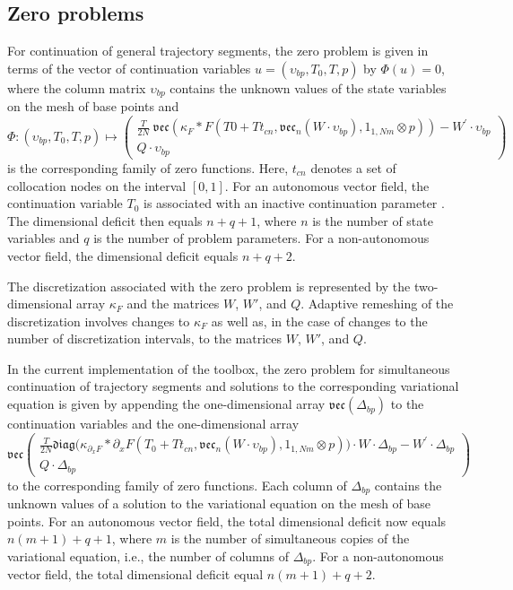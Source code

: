 \subsection{Zero problems}
For continuation of general trajectory segments, the zero problem is given in terms of the vector of continuation variables $u=(\upsilon_{bp},T_0,T,p)$ by $\Phi(u)=0$, where the column matrix $\upsilon_{bp}$ contains the unknown values of the state variables on the mesh of base points and
\begin{equation}
\Phi:\left(\upsilon_{bp}, T_0,T, p\right)\mapsto\left(\begin{array}{c}
\frac{T}{2N}\ \mathfrak{vec}\left(\kappa_F\ast F\left(T0+Tt_{cn}, \mathfrak{vec}_{n}\left( W\cdot
\upsilon_{bp}\right) ,1_{1,Nm}\otimes p\right) \right) -W^{\prime }\cdot \upsilon_{bp}\\
Q\cdot \upsilon_{bp}
\end{array}\right)
\end{equation}
is the corresponding family of zero functions. Here, $t_{cn}$ denotes a set of collocation nodes on the interval $[0,1]$. For an autonomous vector field, the continuation variable $T_0$ is associated with an inactive continuation parameter . The dimensional deficit then equals $n+q+1$, where $n$ is the number of state variables and $q$ is the number of problem parameters. For a non-autonomous vector field, the dimensional deficit equals $n+q+2$.

The discretization associated with the zero problem is represented by the two-dimensional array $\kappa_F$ and the matrices $W$, $W'$, and $Q$. Adaptive remeshing of the discretization involves changes to $\kappa_F$ as well as, in the case of changes to the number of discretization intervals, to the matrices $W$, $W'$, and $Q$.

In the current implementation of the  toolbox, the zero problem for simultaneous continuation of trajectory segments and solutions to the corresponding variational equation is given by appending the one-dimensional array $\mathfrak{vec}\left(\Delta_{bp}\right)$ to the continuation variables and the one-dimensional array
\begin{equation}
\mathfrak{vec}\left(\begin{array}{c}\frac{T}{2N}  \mathfrak{diag}\big(\kappa_{\partial_x F} * \partial_{x}F\left( T_0+Tt_{cn},\mathfrak{vec}_{n}\left( W\cdot \upsilon_{bp}\right),1_{1,Nm}\otimes p\right) \big) \cdot W\cdot\Delta_{bp}-W^{\prime }\cdot\Delta_{bp}\\Q\cdot\Delta_{bp}\end{array}\right)
\end{equation}
to the corresponding family of zero functions. Each column of $\Delta_{bp}$ contains the unknown values of a solution to the variational equation on the mesh of base points.  For an autonomous vector field, the total dimensional deficit now equals $n(m+1)+q+1$, where $m$ is the number of simultaneous copies of the variational equation, i.e., the number of columns of $\Delta_{bp}$. For a non-autonomous vector field, the total dimensional deficit equal $n(m+1)+q+2$.
 
